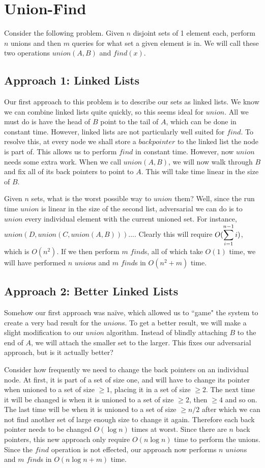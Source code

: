 \chapter{Union-Find}

Consider the following problem. Given $n$ disjoint sets of 1 element each,
perform $n$ unions and then $m$ queries for what set a given element is in.
We will call these two operations $union(A,B)$ and $find(x)$. 

\section{Approach 1: Linked Lists}
Our first
approach to this problem is to describe our sets as linked lists. We know
we can combine linked lists quite quickly, so this seems ideal for $union$. 
All we must do is have the head of $B$ point to the tail of $A$, which can be
done in constant time.
However, linked lists are not particularly well suited for $find$. To resolve
this, at every node we shall store a $back pointer$ to the linked list 
the node is part of. This allows us to perform $find$ in constant time. 
However, now $union$ needs some extra work.
When we call $union(A,B)$, we will now walk through $B$ and fix all of its
back pointers to point to $A$. This will take time linear in the size of $B$.

Given $n$ sets, what is the worst possible way to $union$ them? Well, since
the run time $union$ is linear in the size of the second list, adversarial
we can
do is to $union$ every individual element with the current unioned set. For
instance, $union(D,union(C,union(A,B)))...$. Clearly this will require
$O(\displaystyle\sum\limits_{i=1}^{n-1}i)$, which is $O(n^2)$. If we then perform $m$ $find$s, all
of which take $O(1)$ time, we will have performed $n$ $union$s and $m$ $find$s
in $O(n^2 + m)$ time.

\section{Approach 2: Better Linked Lists}
Somehow our first approach was na\"ive, which allowed us to ``game" the system
to create a very bad result for the $union$s. To get a better result, we will
make a slight modification to our $union$ algorithm. Instead of blindly
attaching $B$ to the end of $A$, we will attach the smaller set to the larger.
This fixes our adversarial approach, but is it actually better? 

Consider how frequently we need to change the back pointers on an individual
node. At first, it is part of a set of size one, and will have to change its
pointer when unioned to a set of size $\geq 1$, placing it in a set
of size $\geq 2$. The next time it will be changed is when it is unioned
to a set of size $\geq 2$, then $\geq 4$ and so on. The last time will be
when it is unioned to a set of size $\geq n/2$ after which we can not find
another set of large enough size to change it again. Therefore each
back pointer needs to be changed $O(\log n)$ times at worst. Since there
are $n$ back pointers, this new approach only require $O(n \log n)$
time to perform the unions. Since the $find$ operation is not effected,
our approach now performs $n$ $union$s and $m$ $find$s
in $O(n \log n + m)$ time.

